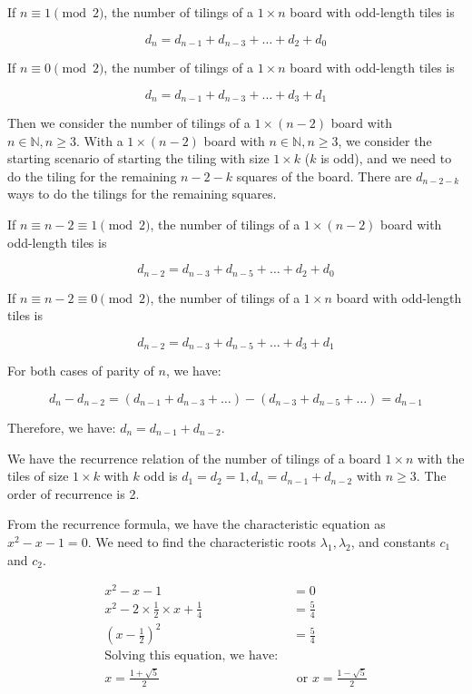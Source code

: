 \documentclass[10pt]{article}
\begin{document}
\begin{enumerate}
\begin{enumerate}
 If $n \equiv 1 \pmod 2$, the number of tilings of a $1 \times n$ board with odd-length tiles is 

 $$d_n = d_{n-1} + d_{n-3} + \ldots + d_2 + d_0$$

 If $n \equiv 0 \pmod 2$, the number of tilings of a $1 \times n$ board with odd-length tiles is 

 $$d_n = d_{n-1} + d_{n-3} + \ldots + d_3 + d_1$$

Then we consider the number of tilings of a $1 \times (n-2)$ board with $n \in \mathbb{N}, n \geq 3$. With a $1 \times (n-2)$ board with $n \in \mathbb{N}, n \geq 3$, we consider the starting scenario of starting the tiling with size $1 \times k$ ($k$ is odd), and we need to do the tiling for the remaining $n-2-k$ squares of the board. There are $d_{n-2-k}$ ways to do the tilings for the remaining squares. 

If $n \equiv n-2  \equiv 1 \pmod 2$, the number of tilings of a $1 \times (n-2)$ board with odd-length tiles is 

 $$d_{n-2} = d_{n-3} + d_{n-5} + \ldots + d_2 + d_0$$

 If $n \equiv n-2 \equiv 0 \pmod 2$, the number of tilings of a $1 \times n$ board with odd-length tiles is 

  $$d_{n-2} = d_{n-3} + d_{n-5} + \ldots + d_3 + d_1$$

For both cases of parity of $n$, we have:

$$d_n - d_{n-2} = \left(d_{n-1} + d_{n-3} + \ldots\right) - \left(d_{n-3} + d_{n-5} + \ldots \right) = d_{n-1}$$

Therefore, we have: $d_n = d_{n-1} + d_{n-2}$.

We have the recurrence relation of the number of tilings of a board $1\times n$ with the tiles of size $1 \times k$ with $k$ odd is $ d_1=d_2=1, d_n = d_{n-1} + d_{n-2}$ with $n \geq 3$. The order of recurrence is 2.

From the recurrence formula, we have the characteristic equation as $x^2 -x -1=0$. We need to find the characteristic roots $\lambda_1, \lambda_2$, and constants $c_1$ and  $c_2$.

\begin{align*}
    x^2 -x -1&=0\\
     x^2 - 2 \times \frac{1}{2} \times x + \frac{1}{4}&=\frac{5}{4}\\
     \left(x - \frac{1}{2}\right)^2&=\frac{5}{4}\\
     \text{Solving this equation, we have: }\\
    x = \frac{1 + \sqrt{5}}{2} &\text{ or } x =\frac{1 - \sqrt{5}}{2}
\end{align*}


\end{enumerate}
\end{enumerate}
\end{document}
